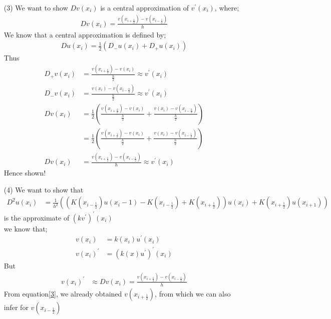 \documentclass[12pt,a4paper]{article}
\begin{document}
\begin{itemize}
	\item[(3)]
	We want to show $Dv(x_{i})$ is a central approximation of $v^{\prime}(x_{i})$, where;
	\begin{align*}
	Dv(x_{i})=\frac{v\left(x_{i+\frac{1}{2}}\right)-v\left(x_{i-\frac{1}{2}}\right)}{h}
	\end{align*}
	We know that a central approximation is defined by;
	\begin{align*}
	Du(x_{i})=\frac{1}{2}\left(D_{-}u(x_{i})+D_{+}u(x_{i})\right)
	\end{align*}
	Thus
	\begin{align*}
	D_{+}v(x_{i})&=\frac{v\left(x_{i+\frac{h}{2}}\right)-v\left(x_{i}\right)}{\frac{h}{2}} \approx v^{\prime}(x_{i})\\
	D_{-}v(x_{i})&=\frac{v\left(x_{i}\right)-v\left(x_{i-\frac{h}{2}}\right)}{\frac{h}{2}} \approx v^{\prime}(x_{i})\\
	Dv(x_{i})&=\frac{1}{2}\left(\frac{v\left(x_{i+\frac{h}{2}}\right)-v\left(x_{i}\right)}{\frac{h}{2}}+\frac{v\left(x_{i}\right)-v\left(x_{i-\frac{h}{2}}\right)}{\frac{h}{2}}\right)\\
	&=\frac{1}{2}\left(\frac{v\left(x_{i+\frac{1}{2}}\right)-v\left(x_{i}\right)}{\frac{h}{2}}+\frac{v\left(x_{i}\right)-v\left(x_{i-\frac{1}{2}}\right)}{\frac{h}{2}}\right)\\
	Dv(x_{i})&=\frac{v\left(x_{i+\frac{1}{2}}\right)-v\left(x_{i-\frac{1}{2}}\right)}{h} \approx v^{\prime}(x_{i})
	\end{align*}
	Hence shown!
	\item[(4)]
	We want to show that
	\begin{align*}
	D^{2}u(x_{i})&=\frac{1}{h^{2}}\left(\left(K\left(x_{i-\frac{1}{2}}\right)u\left(x_{i}-1\right)-K\left(x_{i-\frac{1}{2}}\right)+K\left(x_{i+\frac{1}{2}}\right)\right)u(x_{i})+K\left(x_{i+\frac{1}{2}}\right)u(x_{i+1})\right)
	\end{align*}
	is the approximate of $\left(kv^{\prime}\right)^{\prime}(x_{i})$\\
	\newline
	we know that;
	\begin{align*}
	v(x_{i})&=k(x_{i})u^{\prime}(x_{i})\\
	v(x_{i})^{\prime}&=(k(x)u^{\prime})^{\prime}(x_{i})
	\end{align*}
	But
	\begin{align*}
	v(x_{i})^{\prime} &\approx Dv(x_{i})=\frac{v\left(x_{i+\frac{1}{2}}\right)-v\left(x_{i-\frac{1}{2}}\right)}{h}
	\end{align*}
	From equation\ref{3}, we already obtained $v\left(x_{i+\frac{1}{2}}\right)$, from which we can also infer for $v\left(x_{i-\frac{1}{2}}\right)$

\end{itemize}
\end{document}
